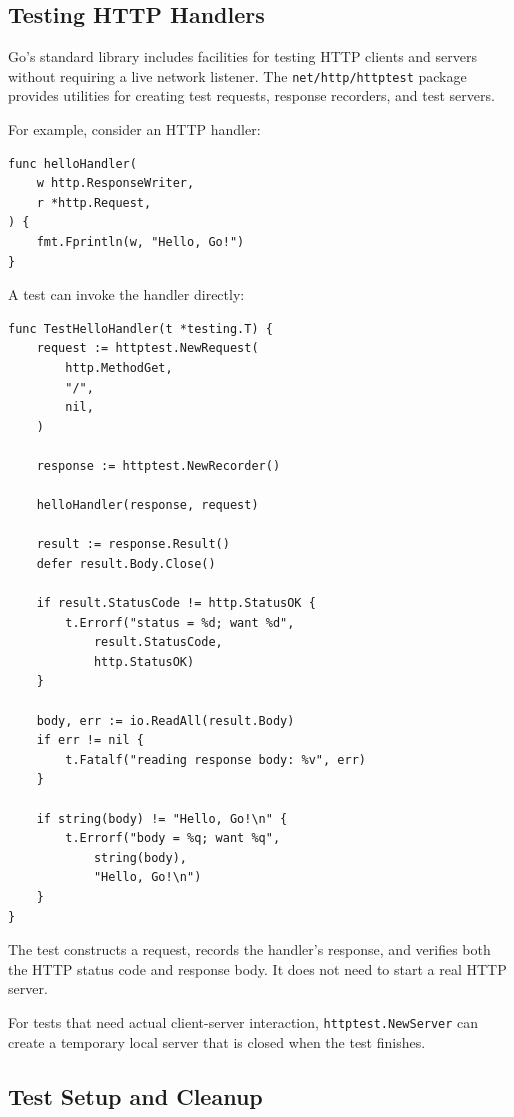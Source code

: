 \subsection{Testing HTTP Handlers}

Go's standard library includes facilities for testing HTTP clients and servers without requiring a live network listener. The \texttt{net/http/httptest} package provides utilities for creating test requests, response recorders, and test servers.

For example, consider an HTTP handler:

\begin{lstlisting}
func helloHandler(
    w http.ResponseWriter,
    r *http.Request,
) {
    fmt.Fprintln(w, "Hello, Go!")
}
\end{lstlisting}

A test can invoke the handler directly:

\begin{lstlisting}
func TestHelloHandler(t *testing.T) {
    request := httptest.NewRequest(
        http.MethodGet,
        "/",
        nil,
    )

    response := httptest.NewRecorder()

    helloHandler(response, request)

    result := response.Result()
    defer result.Body.Close()

    if result.StatusCode != http.StatusOK {
        t.Errorf("status = %d; want %d",
            result.StatusCode,
            http.StatusOK)
    }

    body, err := io.ReadAll(result.Body)
    if err != nil {
        t.Fatalf("reading response body: %v", err)
    }

    if string(body) != "Hello, Go!\n" {
        t.Errorf("body = %q; want %q",
            string(body),
            "Hello, Go!\n")
    }
}
\end{lstlisting}

The test constructs a request, records the handler's response, and verifies both the HTTP status code and response body. It does not need to start a real HTTP server.

For tests that need actual client-server interaction, \texttt{httptest.NewServer} can create a temporary local server that is closed when the test finishes.

\subsection{Test Setup and Cleanup}

